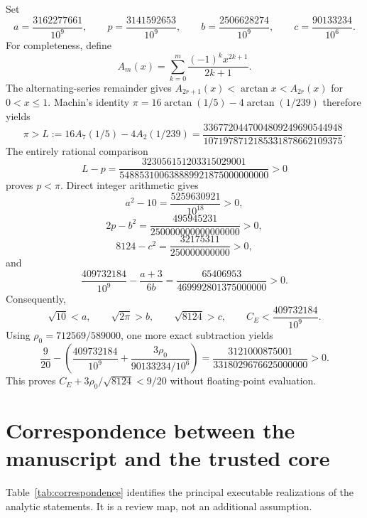 \documentclass[11pt,a4paper,twoside]{article}
\theoremstyle{remark}
\newcommand{\rhozero}{\rho_{0}}
\begin{document}
Set
\[
 a=\frac{3162277661}{10^9},
 \qquad
 p=\frac{3141592653}{10^9},
 \qquad
 b=\frac{2506628274}{10^9},
 \qquad
 c=\frac{90133234}{10^6}.
\]
For completeness, define
\[
 A_m(x)=\sum_{k=0}^{m}\frac{(-1)^k x^{2k+1}}{2k+1}.
\]
The alternating-series remainder gives
\(A_{2r+1}(x)<\arctan x<A_{2r}(x)\) for \(0<x\le1\).
Machin's identity \(\pi=16\arctan(1/5)-4\arctan(1/239)\) therefore yields
\[
 \pi>
 L:=16A_7(1/5)-4A_2(1/239)
 =\frac{3367720447004809249690544948}
        {1071978712185331878662109375}.
\]
The entirely rational comparison
\[
 L-p=
 \frac{323056151203315029001}
      {548853100638889921875000000000}>0
\]
proves \(p<\pi\).
Direct integer arithmetic gives
\[
 a^2-10
 =
 \frac{5259630921}{10^{18}}>0,
\]
\[
 2p-b^2
 =
 \frac{495945231}{250000000000000000}>0,
\]
\[
 8124-c^2
 =
 \frac{32175311}{250000000000}>0,
\]
and
\[
 \frac{409732184}{10^9}
 -\frac{a+3}{6b}
 =
 \frac{65406953}{469992801375000000}>0.
\]
Consequently,
\[
 \sqrt{10}<a,
 \qquad
 \sqrt{2\pi}>b,
 \qquad
 \sqrt{8124}>c,
 \qquad
 C_E<\frac{409732184}{10^9}.
\]
Using \(\rhozero=712569/589000\), one more exact subtraction yields
\[
 \frac9{20}
 -
 \left(
 \frac{409732184}{10^9}
 +
 \frac{3\rhozero}{90133234/10^6}
 \right)
 =
 \frac{3121000875001}{3318029676625000000}>0.
\]
This proves
\(C_E+3\rhozero/\sqrt{8124}<9/20\) without floating-point
evaluation.

\section{Correspondence between the manuscript and the trusted core}
\label{app:correspondence}

Table~\ref{tab:correspondence} identifies the principal executable
realizations of the analytic statements.  It is a review map, not an
additional assumption.
\end{document}
